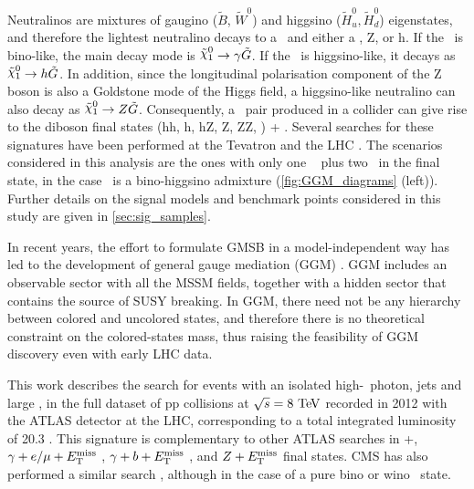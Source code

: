 Neutralinos are mixtures of gaugino ($\tilde{B}$, $\tilde{W}^{0}$) and higgsino ($\tilde{H}^{0}_{u},\tilde{H}^{0}_{d}$) eigenstates, and therefore
the lightest neutralino decays to a \gravino\ and either a \gam, Z, or h. If the \ninoone\ is bino-like, the main decay mode is $\ninoone\to\gam\gravino$. If the \ninoone\ is
higgsino-like, it decays as $\ninoone\to h\gravino$. In addition, since the longitudinal polarisation component of the Z boson is also a Goldstone
mode of the Higgs field, a higgsino-like neutralino can also decay as $\ninoone\to Z\gravino$. Consequently, a \ninoone\ pair produced in a collider
can give rise to the diboson final states (hh, h\gam, hZ, Z\gam, ZZ, \gam\gam) + \etmiss. Several searches for these signatures have been performed at the
Tevatron \cite{Abazov:2007ag,Buescher:2005he} and the LHC \cite{Aad:2012zza,Aad:2012jva,Aad:2011kz,Aad2012519,leptonphoton7,Chatrchyan:2011wc,Chatrchyan:2011ah,tagkey2015503}. The scenarios considered in this analysis are the
ones with only one \gam\ %
plus two \gravino\ in the final state, in the case \ninoone\ is a bino-higgsino admixture (\Fig \ref{fig:GGM_diagrams} (left)). Further details on the signal models and benchmark points
considered in this study are given in \Sec \ref{sec:sig_samples}.

In recent years, the effort to formulate GMSB in a model-independent way has led to the development
of general gauge mediation (GGM) \cite{Meade:2008wd,Buican:2008ws}. GGM includes an observable sector with all the MSSM fields,
together with a hidden sector that contains the source of SUSY breaking. In GGM, there need not be any
hierarchy between colored and uncolored states, and therefore there is no theoretical constraint on the
colored-states mass, thus raising the feasibility of GGM discovery even with early LHC data.

This work describes the search for events with an isolated high-\pt\ photon, jets and large \etmiss, in the full dataset of pp collisions
at $\sqrt{s}=8\tev$ recorded in 2012 with the ATLAS detector at the LHC, corresponding to a total integrated luminosity of 20.3 \ifb.
This signature is complementary to other ATLAS searches in \gam\gam+\etmiss \cite{Aad2012519,ATLAS-CONF-2014-001}, $\gamma+e/\mu+E_{\mathrm{T}}^{\mathrm{miss}}$ \cite{ATLAS-CONF-2012-144}, $\gamma+b+E_{\mathrm{T}}^{\mathrm{miss}}$ \cite{Aad:2012jva},
and $Z+E_{\mathrm{T}}^{\mathrm{miss}}$ \cite{ATLAS-CONF-2012-152} final states. CMS has also performed a similar search \cite{CMS-PAS-SUS-12-018,CMS-PAS-SUS-14-004}, although in the case of a pure bino or wino \ninoone\
state.

